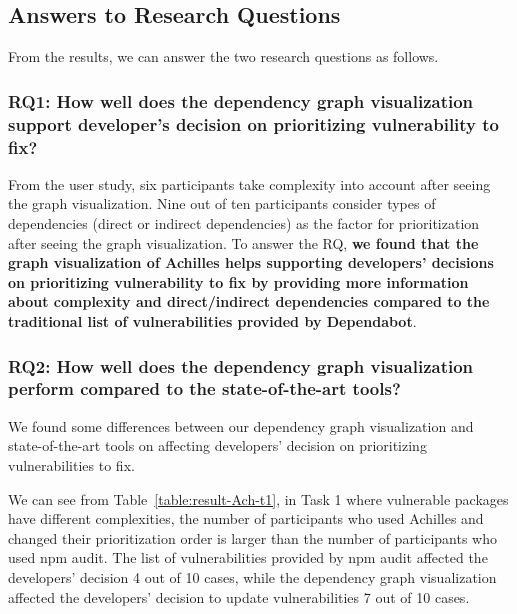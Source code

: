 \documentclass[conference]{IEEEtran}
\begin{document}
	
	\subsection{Answers to Research Questions}
	From the results, we can answer the two research questions as follows.
	
	\subsubsection{RQ1: How well does the dependency graph visualization support developer’s decision on prioritizing vulnerability to fix?}
	From the user study, six participants take complexity into account after seeing the graph visualization. Nine out of ten participants consider types of dependencies (direct or indirect dependencies) as the factor for prioritization after seeing the graph visualization.
	To answer the RQ, \textbf{we found that the graph visualization of Achilles helps supporting developers' decisions on prioritizing vulnerability to fix by providing more information about complexity and direct/indirect dependencies compared to the traditional list of vulnerabilities provided by Dependabot}.
	
	\subsubsection{RQ2: How well does the dependency graph visualization perform compared to the state-of-the-art tools?}
	
	We found some differences between our dependency graph visualization and state-of-the-art tools on affecting developers' decision on prioritizing vulnerabilities to fix. 
	
	We can see from Table~\ref{table:result-Ach-t1}, in Task 1 where vulnerable packages have different complexities, the number of participants who used Achilles and changed their prioritization order is larger than the number of participants who used npm audit. The list of vulnerabilities provided by npm audit affected the developers' decision 4 out of 10 cases, while the dependency graph visualization affected the developers' decision to update vulnerabilities 7 out of 10 cases. %
	
\end{document}
